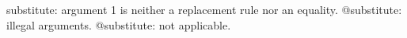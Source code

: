 \documentclass[11pt]{article}
\begin{document}
substitute: argument 1 is neither a replacement rule nor an equality.
@substitute: illegal arguments.
@substitute: not applicable.
\end{document}
